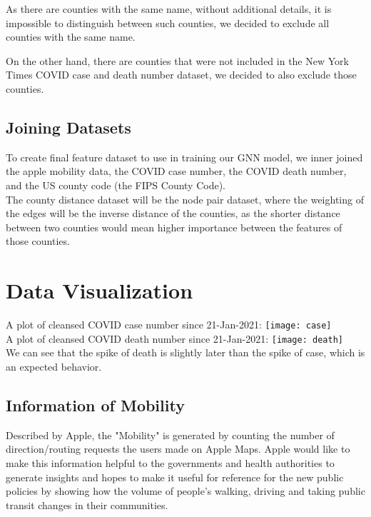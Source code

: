 As there are counties with the same name, without additional details, it is impossible to distinguish between such counties, we decided to exclude all counties with the same name.

On the other hand, there are counties that were not included in the New York Times COVID case and death number dataset, we decided to also exclude those counties.

\subsection{Joining Datasets}

To create final feature dataset to use in training our GNN model, we inner joined the apple mobility data, the COVID case number, the COVID death number, and the US county code (the FIPS County Code). \\

The county distance dataset will be the node pair dataset, where the weighting of the edges will be the inverse distance of the counties, as the shorter distance between two counties would mean higher importance between the features of those counties.


\section{Data Visualization}

A plot of cleansed COVID case number since 21-Jan-2021:
\texttt{[image: case]}\\

A plot of cleansed COVID death number since 21-Jan-2021:
\texttt{[image: death]}\\

We can see that the spike of death is slightly later than the spike of case, which is an expected behavior.

\subsection{Information of Mobility}
Described by Apple, the "Mobility" is generated by counting the number of direction/routing requests the users made on Apple Maps. Apple would like to make this information helpful to the governments and health authorities to generate insights and hopes to make it useful for reference for the new public policies by showing how the volume of people's walking, driving and taking public transit changes in their communities.\\

